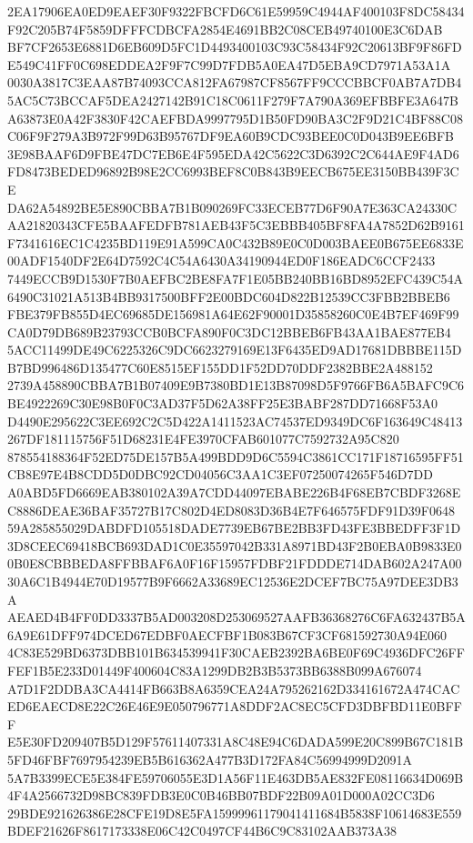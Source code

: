 \documentclass[UTF8,fontset=fandol,zihao=-4,a4paper]{ctexart}
\begin{document}
{{2EA17906EA0ED9EAEF30F9322FBCFD6C61E59959C4944AF400103F8DC58434F92C205B74F5859DFFFCDBCFA2854E4691BB2C08CEB49740100E3C6DAB
BF7CF2653E6881D6EB609D5FC1D4493400103C93C58434F92C20613BF9F86FDE549C41FF0C698EDDEA2F9F7C99D7FDB5A0EA47D5EBA9CD7971A53A1A
0030A3817C3EAA87B74093CCA812FA67987CF8567FF9CCCBBCF0AB7A7DB45AC5C73BCCAF5DEA2427142B91C18C0611F279F7A790A369EFBBFE3A647B
A63873E0A42F3830F42CAEFBDA9997795D1B50FD90BA3C2F9D21C4BF88C08C06F9F279A3B972F99D63B95767DF9EA60B9CDC93BEE0C0D043B9EE6BFB
3E98BAAF6D9FBE47DC7EB6E4F595EDA42C5622C3D6392C2C644AE9F4AD6FD8473BEDED96892B98E2CC6993BEF8C0B843B9EECB675EE3150BB439F3CE
DA62A54892BE5E890CBBA7B1B090269FC33ECEB77D6F90A7E363CA24330CAA21820343CFE5BAAFEDFB781AEB43F5C3EBBB405BF8FA4A7852D62B9161
F7341616EC1C4235BD119E91A599CA0C432B89E0C0D003BAEE0B675EE6833E00ADF1540DF2E64D7592C4C54A6430A34190944ED0F186EADC6CCF2433
7449ECCB9D1530F7B0AEFBC2BE8FA7F1E05BB240BB16BD8952EFC439C54A6490C31021A513B4BB9317500BFF2E00BDC604D822B12539CC3FBB2BBEB6
FBE379FB855D4EC69685DE156981A64E62F90001D35858260C0E4B7EF469F99CA0D79DB689B23793CCB0BCFA890F0C3DC12BBEB6FB43AA1BAE877EB4
5ACC11499DE49C6225326C9DC6623279169E13F6435ED9AD17681DBBBE115DB7BD996486D135477C60E8515EF155DD1F52DD70DDF2382BBE2A488152
2739A458890CBBA7B1B07409E9B7380BD1E13B87098D5F9766FB6A5BAFC9C6BE4922269C30E98B0F0C3AD37F5D62A38FF25E3BABF287DD71668F53A0
D4490E295622C3EE692C2C5D422A1411523AC74537ED9349DC6F163649C48413267DF181115756F51D68231E4FE3970CFAB601077C7592732A95C820
878554188364F52ED75DE157B5A499BDD9D6C5594C3861CC171F18716595FF51CB8E97E4B8CDD5D0DBC92CD04056C3AA1C3EF07250074265F546D7DD
A0ABD5FD6669EAB380102A39A7CDD44097EBABE226B4F68EB7CBDF3268EC8886DEAE36BAF35727B17C802D4ED8083D36B4E7F646575FDF91D39F0648
59A285855029DABDFD105518DADE7739EB67BE2BB3FD43FE3BBEDFF3F1D3D8CEEC69418BCB693DAD1C0E35597042B331A8971BD43F2B0EBA0B9833E0
0B0E8CBBBEDA8FFBBAF6A0F16F15957FDBF21FDDDE714DAB602A247A0030A6C1B4944E70D19577B9F6662A33689EC12536E2DCEF7BC75A97DEE3DB3A
AEAED4B4FF0DD3337B5AD003208D253069527AAFB36368276C6FA632437B5A6A9E61DFF974DCED67EDBF0AECFBF1B083B67CF3CF681592730A94E060
4C83E529BD6373DBB101B634539941F30CAEB2392BA6BE0F69C4936DFC26FFFEF1B5E233D01449F400604C83A1299DB2B3B5373BB6388B099A676074
A7D1F2DDBA3CA4414FB663B8A6359CEA24A795262162D334161672A474CACED6EAECD8E22C26E46E9E050796771A8DDF2AC8EC5CFD3DBFBD11E0BFFF
E5E30FD209407B5D129F57611407331A8C48E94C6DADA599E20C899B67C181B5FD46FBF7697954239EB5B616362A477B3D172FA84C56994999D2091A
5A7B3399ECE5E384FE59706055E3D1A56F11E463DB5AE832FE08116634D069B4F4A2566732D98BC839FDB3E0C0B46BB07BDF22B09A01D000A02CC3D6
29BDE921626386E28CFE19D8E5FA15999961179041411684B5838F10614683E559BDEF21626F8617173338E06C42C0497CF44B6C9C83102AAB373A38
}}
\end{document}
